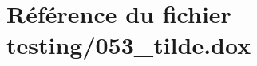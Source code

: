 \hypertarget{053__tilde_8dox}{}\section{Référence du fichier testing/053\+\_\+tilde.dox}
\label{053__tilde_8dox}
